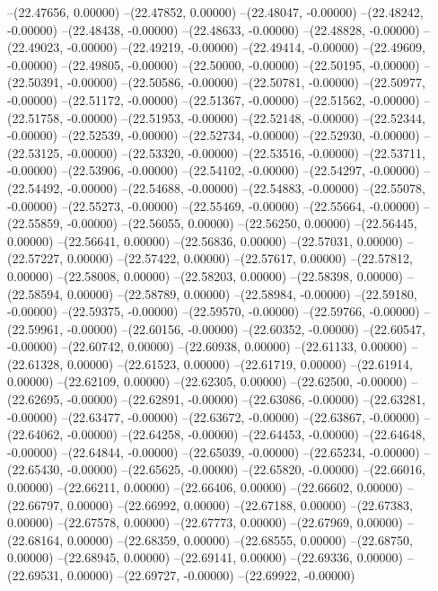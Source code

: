 --(22.47656, 0.00000)
--(22.47852, 0.00000)
--(22.48047, -0.00000)
--(22.48242, -0.00000)
--(22.48438, -0.00000)
--(22.48633, -0.00000)
--(22.48828, -0.00000)
--(22.49023, -0.00000)
--(22.49219, -0.00000)
--(22.49414, -0.00000)
--(22.49609, -0.00000)
--(22.49805, -0.00000)
--(22.50000, -0.00000)
--(22.50195, -0.00000)
--(22.50391, -0.00000)
--(22.50586, -0.00000)
--(22.50781, -0.00000)
--(22.50977, -0.00000)
--(22.51172, -0.00000)
--(22.51367, -0.00000)
--(22.51562, -0.00000)
--(22.51758, -0.00000)
--(22.51953, -0.00000)
--(22.52148, -0.00000)
--(22.52344, -0.00000)
--(22.52539, -0.00000)
--(22.52734, -0.00000)
--(22.52930, -0.00000)
--(22.53125, -0.00000)
--(22.53320, -0.00000)
--(22.53516, -0.00000)
--(22.53711, -0.00000)
--(22.53906, -0.00000)
--(22.54102, -0.00000)
--(22.54297, -0.00000)
--(22.54492, -0.00000)
--(22.54688, -0.00000)
--(22.54883, -0.00000)
--(22.55078, -0.00000)
--(22.55273, -0.00000)
--(22.55469, -0.00000)
--(22.55664, -0.00000)
--(22.55859, -0.00000)
--(22.56055, 0.00000)
--(22.56250, 0.00000)
--(22.56445, 0.00000)
--(22.56641, 0.00000)
--(22.56836, 0.00000)
--(22.57031, 0.00000)
--(22.57227, 0.00000)
--(22.57422, 0.00000)
--(22.57617, 0.00000)
--(22.57812, 0.00000)
--(22.58008, 0.00000)
--(22.58203, 0.00000)
--(22.58398, 0.00000)
--(22.58594, 0.00000)
--(22.58789, 0.00000)
--(22.58984, -0.00000)
--(22.59180, -0.00000)
--(22.59375, -0.00000)
--(22.59570, -0.00000)
--(22.59766, -0.00000)
--(22.59961, -0.00000)
--(22.60156, -0.00000)
--(22.60352, -0.00000)
--(22.60547, -0.00000)
--(22.60742, 0.00000)
--(22.60938, 0.00000)
--(22.61133, 0.00000)
--(22.61328, 0.00000)
--(22.61523, 0.00000)
--(22.61719, 0.00000)
--(22.61914, 0.00000)
--(22.62109, 0.00000)
--(22.62305, 0.00000)
--(22.62500, -0.00000)
--(22.62695, -0.00000)
--(22.62891, -0.00000)
--(22.63086, -0.00000)
--(22.63281, -0.00000)
--(22.63477, -0.00000)
--(22.63672, -0.00000)
--(22.63867, -0.00000)
--(22.64062, -0.00000)
--(22.64258, -0.00000)
--(22.64453, -0.00000)
--(22.64648, -0.00000)
--(22.64844, -0.00000)
--(22.65039, -0.00000)
--(22.65234, -0.00000)
--(22.65430, -0.00000)
--(22.65625, -0.00000)
--(22.65820, -0.00000)
--(22.66016, 0.00000)
--(22.66211, 0.00000)
--(22.66406, 0.00000)
--(22.66602, 0.00000)
--(22.66797, 0.00000)
--(22.66992, 0.00000)
--(22.67188, 0.00000)
--(22.67383, 0.00000)
--(22.67578, 0.00000)
--(22.67773, 0.00000)
--(22.67969, 0.00000)
--(22.68164, 0.00000)
--(22.68359, 0.00000)
--(22.68555, 0.00000)
--(22.68750, 0.00000)
--(22.68945, 0.00000)
--(22.69141, 0.00000)
--(22.69336, 0.00000)
--(22.69531, 0.00000)
--(22.69727, -0.00000)
--(22.69922, -0.00000)
